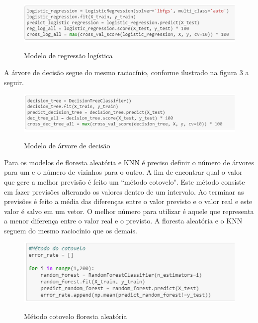 \begin{figure}[htbp]
  \begin{center}
  \includegraphics[width=1.\linewidth]{imagens/cod_reg_log.png}\\
  \end{center}
  \caption[Modelo de regressão logística]{Modelo de regressão logística}
  \label{fig:logo}
\end{figure}

	A árvore de decisão segue do mesmo raciocínio, conforme ilustrado na figura 3 a seguir.
	
\begin{figure}[htbp]
  \begin{center}
  \includegraphics[width=1.\linewidth]{imagens/cod_dec_tree.png}\\
  \end{center}
  \caption[Modelo de árvore de decisão]{Modelo de árvore de decisão}
  \label{fig:logo}
\end{figure}

	Para os modelos de floresta aleatória e KNN é preciso definir o número de árvores para um e o número de vizinhos para o outro. A fim de encontrar qual o valor que gere a melhor previsão é feito um ``método cotovelo". Este método consiste em fazer previsões alterando os valores dentro de um intervalo. Ao terminar as previsões é feito a média das diferenças entre o valor previsto e o valor real e este valor é salvo em um vetor. O melhor número para utilizar é aquele que representa a menor diferença entre o valor real e o previsto. A floresta aleatória e o KNN seguem do mesmo raciocínio que os demais.
	
\begin{figure}[htbp]
  \begin{center}
  \includegraphics[width=0.8\linewidth]{imagens/cotovelo_floresta.png}\\
  \end{center}
  \caption[Método cotovelo floresta aleatória]{Método cotovelo floresta aleatória}
  \label{fig:logo}
\end{figure}

